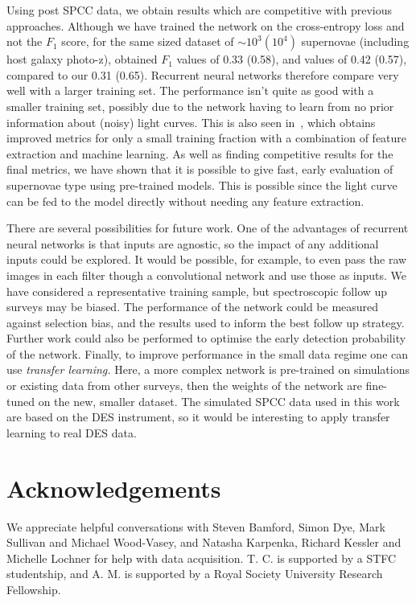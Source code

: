 \documentclass[nofootinbib,amsmath,amssymb,10pt,eqsecnum, twocolumn]{revtex4-1}
\begin{document}
Using post SPCC data, we obtain results which are competitive with previous approaches.  Although we have trained the network on the cross-entropy loss  and not the $F_1$ score, for the same sized dataset of $\sim10^3 (10^4)$ supernovae (including host galaxy photo-z), \cite{Karpenka:2012pm} obtained $F_1$ values of 0.33 (0.58), and \cite{Newling:2010bp} values of 0.42 (0.57), compared to our  0.31 (0.65). Recurrent neural networks  therefore compare very well with a larger training  set. The performance isn't  quite as good with a smaller training set, possibly due to the network having to learn from no prior information about (noisy) light curves. This is also seen in~\cite{Lochner:2016hbn}, which obtains improved metrics for only a small training fraction with a combination of feature extraction and machine learning. As well as finding competitive results for the final metrics, we have shown that it is possible to give fast, early evaluation of supernovae type using pre-trained models. This is possible since the light curve can be fed to the model directly without needing any feature extraction.  

There are several possibilities for future work. One of the advantages of recurrent neural networks is that inputs are agnostic, so the impact of any additional inputs could be explored. It would be possible, for example, to even pass the raw images in each filter though a convolutional network and use those as inputs. We have considered a representative training sample, but spectroscopic follow up surveys may be biased. The performance of the network could be measured against selection bias, and the results used to inform the best follow up strategy.  Further work could also be performed to optimise the early detection probability of the network.  Finally, to improve performance in the small data regime one can use {\em transfer learning.} Here, a more complex network is pre-trained on simulations or existing data from other surveys, then the weights of the network are fine-tuned on the new, smaller dataset. The simulated SPCC data used in this work are based on the DES instrument, so it would be interesting to apply transfer learning to real DES data. 

\section*{Acknowledgements}

We appreciate helpful conversations with Steven Bamford, Simon Dye, Mark Sullivan and Michael Wood-Vasey, and Natasha Karpenka, Richard Kessler and Michelle Lochner for help with data acquisition. T. C. is supported by a STFC studentship, and A. M. is supported by a Royal Society University Research Fellowship.


\end{document}
